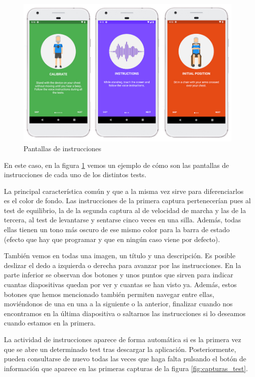 \begin{figure}[H]
	\centering
	\includegraphics[scale=0.4]{imagenes/capturas_instrucciones.jpg}
	\caption{Pantallas de instrucciones\label{fig:capturas_instrucciones}}
\end{figure}

En este caso, en la figura \ref{fig:capturas_instrucciones} vemos un ejemplo de cómo son las pantallas de instrucciones de cada uno de los distintos tests.

La principal característica común y que a la misma vez sirve para diferenciarlos es el color de fondo. Las instrucciones de la primera captura pertenecerían pues al test de equilibrio, la de la segunda captura al de velocidad de marcha y las de la tercera, al test de levantarse y sentarse cinco veces en una silla. Además, todas ellas tienen un tono más oscuro de ese mismo color para la barra de estado (efecto que hay que programar y que en ningún caso viene por defecto). 

También vemos en todas una imagen, un título y una descripción. Es posible deslizar el dedo a izquierda o derecha para avanzar por las instrucciones. En la parte inferior se observan dos botones y unos puntos que sirven para indicar cuantas diapositivas quedan por ver y cuantas se han visto ya. Además, estos botones que hemos mencionado también permiten navegar entre ellas, moviéndonos de una en una a la siguiente o la anterior, finalizar cuando nos encontramos en la última diapositiva o saltarnos las instrucciones si lo deseamos cuando estamos en la primera.

La actividad de instrucciones aparece de forma automática si es la primera vez que se abre un determinado test tras descargar la aplicación. Posteriormente, pueden consultarse de nuevo todas las veces que haga falta pulsando el botón de información que aparece en las primeras capturas de la figura \ref{fig:capturas_test}.

